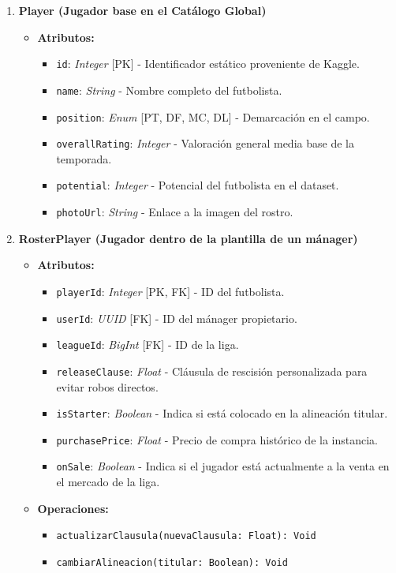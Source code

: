 \begin{enumerate}
    \item \textbf{Player (Jugador base en el Catálogo Global)}
    \begin{itemize}
        \item \textbf{Atributos:}
            \begin{itemize}
                \item \texttt{id}: \textit{Integer} [PK] - Identificador estático proveniente de Kaggle.
                \item \texttt{name}: \textit{String} - Nombre completo del futbolista.
                \item \texttt{position}: \textit{Enum} [PT, DF, MC, DL] - Demarcación en el campo.
                \item \texttt{overallRating}: \textit{Integer} - Valoración general media base de la temporada.
                \item \texttt{potential}: \textit{Integer} - Potencial del futbolista en el dataset.
                \item \texttt{photoUrl}: \textit{String} - Enlace a la imagen del rostro.
            \end{itemize}
    \end{itemize}

    \item \textbf{RosterPlayer (Jugador dentro de la plantilla de un mánager)}
    \begin{itemize}
        \item \textbf{Atributos:}
            \begin{itemize}
                \item \texttt{playerId}: \textit{Integer} [PK, FK] - ID del futbolista.
                \item \texttt{userId}: \textit{UUID} [FK] - ID del mánager propietario.
                \item \texttt{leagueId}: \textit{BigInt} [FK] - ID de la liga.
                \item \texttt{releaseClause}: \textit{Float} - Cláusula de rescisión personalizada para evitar robos directos.
                \item \texttt{isStarter}: \textit{Boolean} - Indica si está colocado en la alineación titular.
                \item \texttt{purchasePrice}: \textit{Float} - Precio de compra histórico de la instancia.
                \item \texttt{onSale}: \textit{Boolean} - Indica si el jugador está actualmente a la venta en el mercado de la liga.
            \end{itemize}
        \item \textbf{Operaciones:}
            \begin{itemize}
                \item \texttt{actualizarClausula(nuevaClausula: Float): Void}
                \item \texttt{cambiarAlineacion(titular: Boolean): Void}
            \end{itemize}
    \end{itemize}


\end{enumerate}
